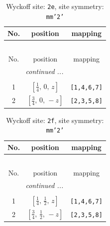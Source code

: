 \documentclass[fleqn,8pt]{jsarticle}
\begin{document}
\begin{longtable}{ccc}
\caption{Wyckoff site: {\tt 2e}, site symmetry: {\tt mm'2'}}
 \\
 \hline \hline
No. & position & mapping \\ \hline \endfirsthead

\multicolumn{2}{l}{\tablename\ \thetable{}} \\
 \hline \hline
No. & position & mapping \\ \hline \endhead

 \hline \hline
\multicolumn{2}{r}{\footnotesize\it continued ...} \\ \endfoot

 \hline \hline
\multicolumn{2}{r}{} \\ \endlastfoot

1 & $\left[ \frac{1}{4},\, 0,\, z \right]$ & {\tt [1,4,6,7]} \\ \hline
2 & $\left[ \frac{3}{4},\, 0,\, - z \right]$ & {\tt [2,3,5,8]} \\
\end{longtable}
\renewcommand{\arraystretch}{1.2}
\begin{longtable}{ccc}
\caption{Wyckoff site: {\tt 2f}, site symmetry: {\tt mm'2'}}
 \\
 \hline \hline
No. & position & mapping \\ \hline \endfirsthead

\multicolumn{2}{l}{\tablename\ \thetable{}} \\
 \hline \hline
No. & position & mapping \\ \hline \endhead

 \hline \hline
\multicolumn{2}{r}{\footnotesize\it continued ...} \\ \endfoot

 \hline \hline
\multicolumn{2}{r}{} \\ \endlastfoot

1 & $\left[ \frac{1}{4},\, \frac{1}{2},\, z \right]$ & {\tt [1,4,6,7]} \\ \hline
2 & $\left[ \frac{3}{4},\, \frac{1}{2},\, - z \right]$ & {\tt [2,3,5,8]} \\
\end{longtable}
\renewcommand{\arraystretch}{1.2}
\end{document}
